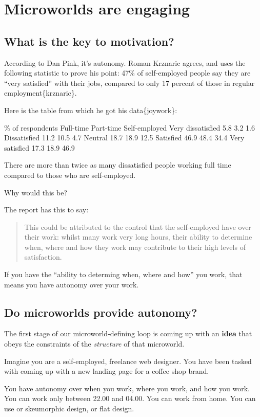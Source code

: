 \section{Microworlds are engaging}

\subsection{What is the key to motivation?}

According to Dan Pink, it's autonomy. Roman Krznaric agrees, and uses
the following statistic to prove his point: 47\% of self-employed people
say they are ``very satisfied'' with their jobs, compared to only 17
percent of those in regular employment\{krznaric\}.

Here is the table from which he got his data\{joywork\}:

\% of respondents Full-time Part-time Self-employed Very dissatisfied
5.8 3.2 1.6 Dissatisfied 11.2 10.5 4.7 Neutral 18.7 18.9 12.5 Satisfied
46.9 48.4 34.4 Very satisfied 17.3 18.9 46.9

There are more than twice as many dissatisfied people working full time
compared to those who are self-employed.

Why would this be?

The report has this to say:

\begin{quote}
This could be attributed to the control that the self-employed have over
their work: whilst many work very long hours, their ability to determine
when, where and how they work may contribute to their high levels of
satisfaction.
\end{quote}

If you have the ``ability to determing when, where and how'' you work,
that means you have autonomy over your work.

\subsection{Do microworlds provide autonomy?}

The first stage of our microworld-defining loop is coming up with an
\textbf{idea} that obeys the constraints of the \emph{structure} of that
microworld.

Imagine you are a self-employed, freelance web designer. You have been
tasked with coming up with a new landing page for a coffee shop brand.

You have autonomy over when you work, where you work, and how you work.
You can work only between 22.00 and 04.00. You can work from home. You
can use or skeumorphic design, or flat design.

